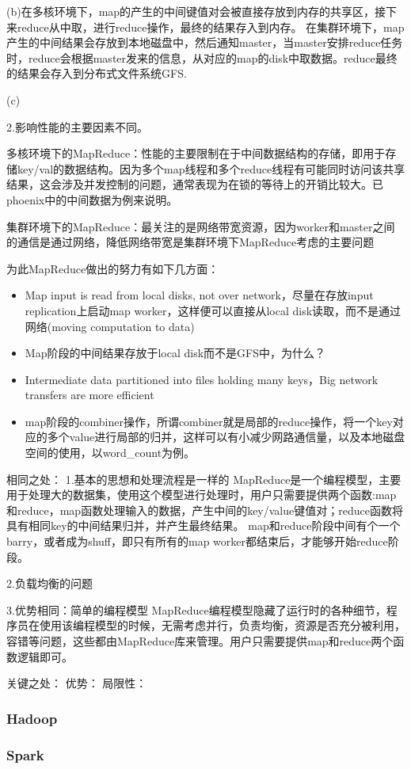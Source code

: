 (b)在多核环境下，map的产生的中间键值对会被直接存放到内存的共享区，接下来reduce从中取，进行reduce操作，最终的结果存入到内存。
在集群环境下，map产生的中间结果会存放到本地磁盘中，然后通知master，当master安排reduce任务时，reduce会根据master发来的信息，从对应的map的disk中取数据。reduce最终的结果会存入到分布式文件系统GFS.

(c)

2.影响性能的主要因素不同。

多核环境下的MapReduce：性能的主要限制在于中间数据结构的存储，即用于存储key/val的数据结构。因为多个map线程和多个reduce线程有可能同时访问该共享结果，这会涉及并发控制的问题，通常表现为在锁的等待上的开销比较大。已phoenix中的中间数据为例来说明。

集群环境下的MapReduce：最关注的是网络带宽资源，因为worker和master之间的通信是通过网络，降低网络带宽是集群环境下MapReduce考虑的主要问题

为此MapReduce做出的努力有如下几方面：
\begin{itemize}
  \item Map input is read from local disks, not over network，尽量在存放input replication上启动map worker，这样便可以直接从local disk读取，而不是通过网络(moving computation to data)
  \item Map阶段的中间结果存放于local disk而不是GFS中，为什么？
  \item Intermediate data partitioned into files holding many keys，Big network transfers are more efficient
  \item map阶段的combiner操作，所谓combiner就是局部的reduce操作，将一个key对应的多个value进行局部的归并，这样可以有小减少网路通信量，以及本地磁盘空间的使用，以word\_count为例。
\end{itemize}

相同之处：
1.基本的思想和处理流程是一样的
MapReduce是一个编程模型，主要用于处理大的数据集，使用这个模型进行处理时，用户只需要提供两个函数:map和reduce，map函数处理输入的数据，产生中间的key/value键值对；reduce函数将具有相同key的中间结果归并，并产生最终结果。
map和reduce阶段中间有个一个barry，或者成为shuff，即只有所有的map worker都结束后，才能够开始reduce阶段。

2.负载均衡的问题

3.优势相同：简单的编程模型
MapReduce编程模型隐藏了运行时的各种细节，程序员在使用该编程模型的时候，无需考虑并行，负责均衡，资源是否充分被利用，容错等问题，这些都由MapReduce库来管理。用户只需要提供map和reduce两个函数逻辑即可。

关键之处：
优势：
局限性：

\subsubsection{Hadoop}

\subsubsection{Spark}
